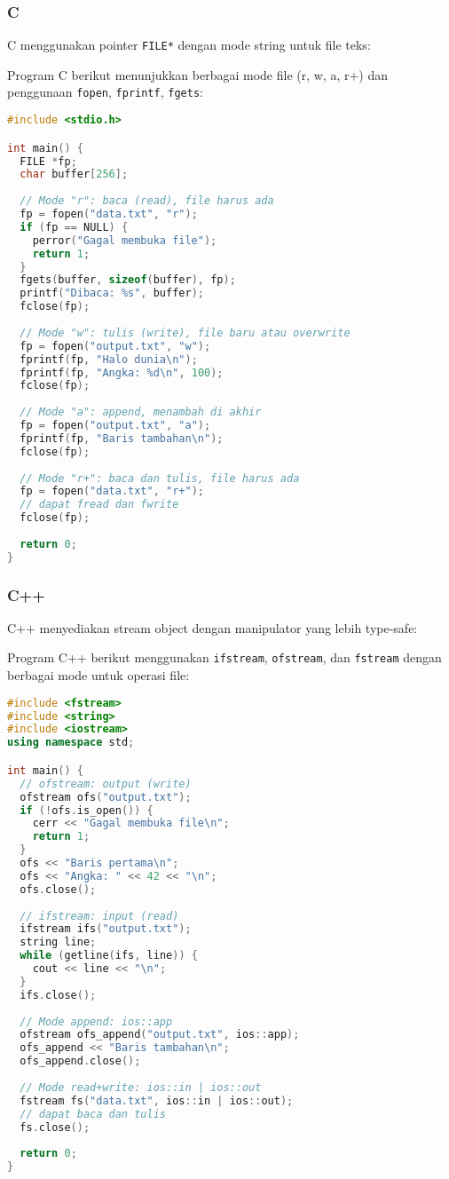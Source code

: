 \documentclass[../main.tex]{subfiles}
\begin{document}
\subsubsection{C}
C menggunakan pointer \texttt{FILE*} dengan mode string untuk file teks:

Program C berikut menunjukkan berbagai mode file (r, w, a, r+) dan penggunaan \texttt{fopen}, \texttt{fprintf}, \texttt{fgets}:

\begin{lstlisting}[language=C, caption={Mode file teks di C}]
#include <stdio.h>

int main() {
  FILE *fp;
  char buffer[256];
  
  // Mode "r": baca (read), file harus ada
  fp = fopen("data.txt", "r");
  if (fp == NULL) {
    perror("Gagal membuka file");
    return 1;
  }
  fgets(buffer, sizeof(buffer), fp);
  printf("Dibaca: %s", buffer);
  fclose(fp);
  
  // Mode "w": tulis (write), file baru atau overwrite
  fp = fopen("output.txt", "w");
  fprintf(fp, "Halo dunia\n");
  fprintf(fp, "Angka: %d\n", 100);
  fclose(fp);
  
  // Mode "a": append, menambah di akhir
  fp = fopen("output.txt", "a");
  fprintf(fp, "Baris tambahan\n");
  fclose(fp);
  
  // Mode "r+": baca dan tulis, file harus ada
  fp = fopen("data.txt", "r+");
  // dapat fread dan fwrite
  fclose(fp);
  
  return 0;
}
\end{lstlisting}

\subsubsection{C++}
C++ menyediakan stream object dengan manipulator yang lebih type-safe:

Program C++ berikut menggunakan \texttt{ifstream}, \texttt{ofstream}, dan \texttt{fstream} dengan berbagai mode untuk operasi file:

\begin{lstlisting}[language=C++, caption={Mode file teks di C++}]
#include <fstream>
#include <string>
#include <iostream>
using namespace std;

int main() {
  // ofstream: output (write)
  ofstream ofs("output.txt");
  if (!ofs.is_open()) {
    cerr << "Gagal membuka file\n";
    return 1;
  }
  ofs << "Baris pertama\n";
  ofs << "Angka: " << 42 << "\n";
  ofs.close();
  
  // ifstream: input (read)
  ifstream ifs("output.txt");
  string line;
  while (getline(ifs, line)) {
    cout << line << "\n";
  }
  ifs.close();
  
  // Mode append: ios::app
  ofstream ofs_append("output.txt", ios::app);
  ofs_append << "Baris tambahan\n";
  ofs_append.close();
  
  // Mode read+write: ios::in | ios::out
  fstream fs("data.txt", ios::in | ios::out);
  // dapat baca dan tulis
  fs.close();
  
  return 0;
}
\end{lstlisting}
\end{document}
